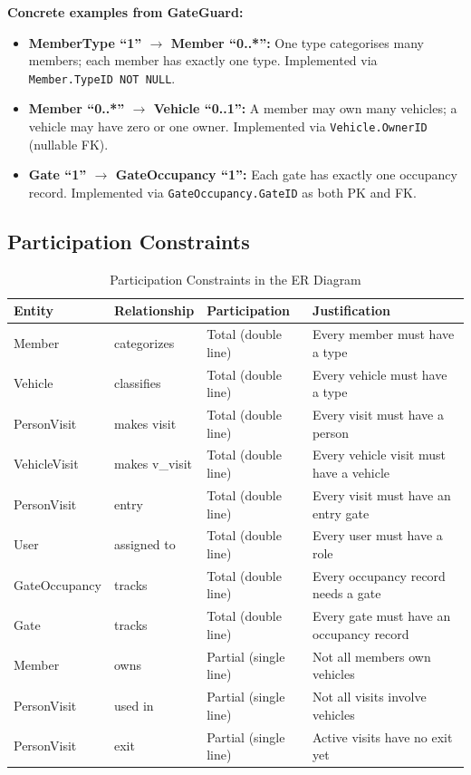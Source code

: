 \documentclass[a4paper, 12pt]{article}
\begin{document}
\textbf{Concrete examples from GateGuard:}
\begin{itemize}[leftmargin=*, nosep]
    \item \textbf{MemberType ``1'' $\rightarrow$ Member ``0..*'':} One type categorises many members; each member has exactly one type. Implemented via \texttt{Member.TypeID NOT NULL}.
    \item \textbf{Member ``0..*'' $\rightarrow$ Vehicle ``0..1'':} A member may own many vehicles; a vehicle may have zero or one owner. Implemented via \texttt{Vehicle.OwnerID} (nullable FK).
    \item \textbf{Gate ``1'' $\rightarrow$ GateOccupancy ``1'':} Each gate has exactly one occupancy record. Implemented via \texttt{GateOccupancy.GateID} as both PK and FK.
\end{itemize}

\subsection{Participation Constraints}

\begin{table}[H]
\centering
\caption{Participation Constraints in the ER Diagram}
\label{tab:participation}
\begin{tabularx}{\textwidth}{l l l X}
\toprule
\textbf{Entity} & \textbf{Relationship} & \textbf{Participation} & \textbf{Justification} \\
\midrule
Member & categorizes & Total (double line) & Every member must have a type \\
Vehicle & classifies & Total (double line) & Every vehicle must have a type \\
PersonVisit & makes visit & Total (double line) & Every visit must have a person \\
VehicleVisit & makes v\_visit & Total (double line) & Every vehicle visit must have a vehicle \\
PersonVisit & entry & Total (double line) & Every visit must have an entry gate \\
User & assigned to & Total (double line) & Every user must have a role \\
GateOccupancy & tracks & Total (double line) & Every occupancy record needs a gate \\
Gate & tracks & Total (double line) & Every gate must have an occupancy record \\
\addlinespace
Member & owns & Partial (single line) & Not all members own vehicles \\
PersonVisit & used in & Partial (single line) & Not all visits involve vehicles \\
PersonVisit & exit & Partial (single line) & Active visits have no exit yet \\
\bottomrule
\end{tabularx}
\end{table}
\end{document}
